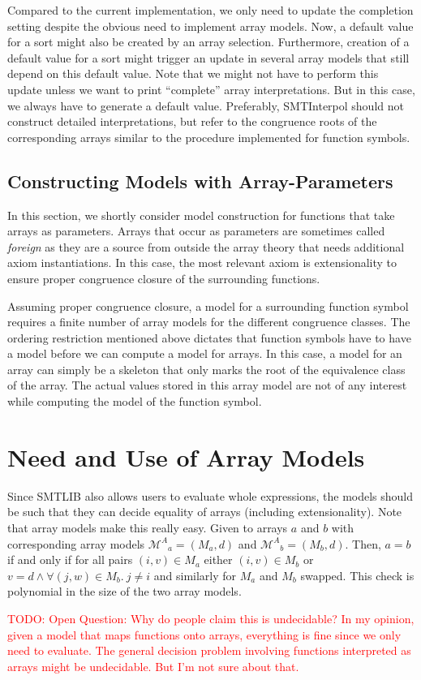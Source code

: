 \documentclass[a4paper,12pt]{article}
\newcommand\si{SMTInterpol\xspace}
\newcommand\m{\mathcal{M}}
\newcommand\ma{\ensuremath{\m^A}\xspace}
\newcommand\todo[1]{\textcolor{red}{TODO: #1}}
\begin{document}
Compared to the current implementation, we only need to update the completion
setting despite the obvious need to implement array models.  Now, a default
value for a sort might also be created by an array selection.  Furthermore,
creation of a default value for a sort might trigger an update in several
array models that still depend on this default value.  Note that we might not
have to perform this update unless we want to print ``complete'' array
interpretations.  But in this case, we always have to generate a default
value.  Preferably, \si should not construct detailed interpretations, but
refer to the congruence roots of the corresponding arrays similar to the
procedure implemented for function symbols.

\subsection{Constructing Models with Array-Parameters}
In this section, we shortly consider model construction for functions that
take arrays as parameters.  Arrays that occur as parameters are sometimes
called \emph{foreign} as they are a source from outside the array theory that
needs additional axiom instantiations.  In this case, the most relevant axiom
is extensionality to ensure proper congruence closure of the surrounding
functions.

Assuming proper congruence closure, a model for a surrounding function symbol
requires a finite number of array models for the different congruence
classes.  The ordering restriction mentioned above dictates that function
symbols have to have a model before we can compute a model for arrays.  In
this case, a model for an array can simply be a skeleton that only marks the
root of the equivalence class of the array.  The actual values stored in this
array model are not of any interest while computing the model of the function
symbol.

\section{Need and Use of Array Models}
Since SMTLIB also allows users to evaluate whole expressions, the models
should be such that they can decide equality of arrays (including
extensionality).  Note that array models make this really easy.  Given to
arrays $a$ and $b$ with corresponding array models $\ma_a=(M_a, d)$ and
$\ma_b=(M_b, d)$.  Then, $a=b$ if and only if for all pairs $(i,v)\in M_a$
either $(i,v)\in M_b$ or $v=d\land\forall (j,w)\in M_b.\ j\neq i$ and
similarly for $M_a$ and $M_b$ swapped.  This check is polynomial in the size
of the two array models.

\todo{Open Question:  Why do people claim this is undecidable?  In my opinion,
  given a model that maps functions onto arrays, everything is fine since we
  only need to evaluate.  The general decision problem involving functions
  interpreted as arrays might be undecidable.  But I'm not sure about that.}
\end{document}
